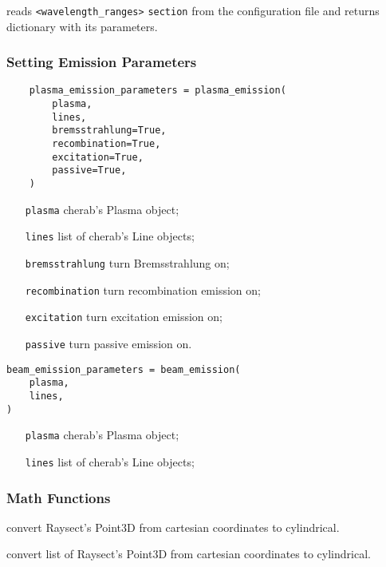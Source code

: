 \documentclass[../../main.tex]{subfiles}
\begin{document}
reads \texttt{<wavelength\_ranges>} \texttt{section} from the configuration file and returns dictionary with its parameters.


\subsubsection{Setting Emission Parameters}%
\label{sec:emission}

\begin{verbatim}
    plasma_emission_parameters = plasma_emission(
        plasma,
        lines,
        bremsstrahlung=True,
        recombination=True,
        excitation=True,
        passive=True,
    )
\end{verbatim}

\begin{itemize}[align=left]
    \item[\texttt{plasma}] cherab's Plasma object;
    \item[\texttt{lines}] list of cherab's Line objects;
    \item[\texttt{bremsstrahlung}] turn Bremsstrahlung on;
    \item[\texttt{recombination}] turn recombination emission on;
    \item[\texttt{excitation}] turn excitation emission on;
    \item[\texttt{passive}] turn passive emission on.
\end{itemize}

\begin{verbatim}
beam_emission_parameters = beam_emission(
    plasma,
    lines,
)
\end{verbatim}

\begin{itemize}[align=left]
    \item[\texttt{plasma}] cherab's Plasma object;
    \item[\texttt{lines}] list of cherab's Line objects;
\end{itemize}

\subsubsection{Math Functions}%
\label{sec:math}

convert Raysect's Point3D from cartesian coordinates to cylindrical.

convert list of Raysect's Point3D from cartesian coordinates to cylindrical.
\end{document}
